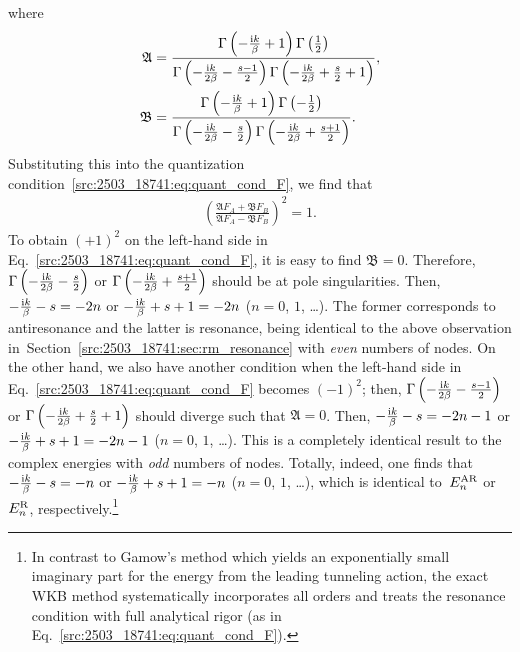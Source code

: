 where
\begin{align}
    \mathfrak{A} &= \frac{\Gamma\left(-\frac{\mathrm{i} k}{\beta}+1\right)\Gamma\left(\frac{1}{2}\right)}
    {\Gamma\left(-\frac{\mathrm{i} k}{2\beta}-\frac{s-1}{2}\right)\Gamma\left(-\frac{\mathrm{i} k}{2\beta}+\frac{s}{2}+1\right)},
    \notag\\
    \mathfrak{B} &= \frac{\Gamma\left(-\frac{\mathrm{i} k}{\beta}+1\right)\Gamma\left(-\frac{1}{2}\right)}
    {\Gamma\left(-\frac{\mathrm{i} k}{2\beta}-\frac{s}{2}\right)\Gamma\left(-\frac{\mathrm{i} k}{2\beta}+\frac{s+1}{2}\right)} .
\end{align}
Substituting this into the quantization condition~\eqref{src:2503_18741:eq:quant_cond_F}, we find that
\begin{align}
    \left(\frac{\mathfrak{A} F_A + \mathfrak{B} F_B}{\mathfrak{A} F_A - \mathfrak{B} F_B}\right)^2 = 1 .
\end{align}
To obtain $(+1)^2$ on the left-hand side in Eq.~\eqref{src:2503_18741:eq:quant_cond_F}, it is easy to find $\mathfrak{B}=0$.
Therefore, $\Gamma\left(-\frac{\mathrm{i} k}{2\beta}-\frac{s}{2}\right)$ or
$\Gamma\left(-\frac{\mathrm{i} k}{2\beta}+\frac{s+1}{2}\right)$ should be at pole singularities.
Then, $-\frac{\mathrm{i} k}{\beta}-s=-2n$ or $-\frac{\mathrm{i} k}{\beta}+s+1=-2n$ ($n=0$, $1$, \dots).
The former corresponds to antiresonance and the latter is resonance,
being identical to the above observation in~Section~\ref{src:2503_18741:sec:rm_resonance} with \textit{even} numbers of nodes.
On the other hand, we also have another condition when the left-hand side in Eq.~\eqref{src:2503_18741:eq:quant_cond_F} becomes $(-1)^2$; then, $\Gamma\left(-\frac{\mathrm{i} k}{2\beta}-\frac{s-1}{2}\right)$ or $\Gamma\left(-\frac{\mathrm{i} k}{2\beta}+\frac{s}{2}+1\right)$ should diverge such that $\mathfrak{A}=0$.
Then, $-\frac{\mathrm{i} k}{\beta}-s=-2n-1$ or $-\frac{\mathrm{i} k}{\beta}+s+1=-2n-1$ ($n=0$, $1$, \dots).
This is a completely identical result to the complex energies with \textit{odd} numbers of nodes.
Totally, indeed, one finds that $-\frac{\mathrm{i} k}{\beta}-s=-n$ or $-\frac{\mathrm{i} k}{\beta}+s+1=-n$ ($n=0$, $1$, \dots), which is identical to~$E_n^{\mathrm{AR}}$ or $E_n^{\mathrm{R}}$, respectively.\footnote{In contrast to Gamow’s method which yields an exponentially small imaginary part for the energy from the leading tunneling action, the exact WKB method systematically incorporates all orders and treats the resonance condition with full analytical rigor (as in Eq.~\eqref{src:2503_18741:eq:quant_cond_F}).}


